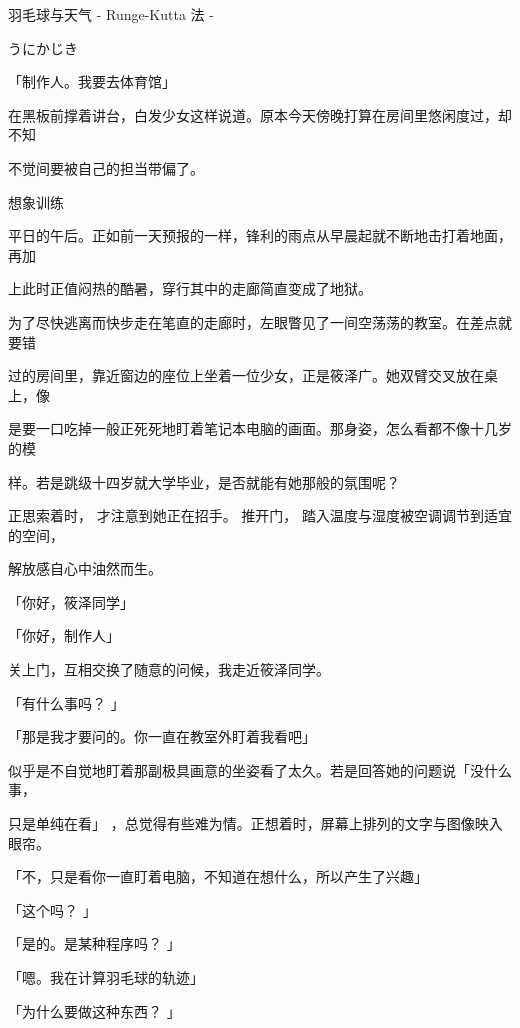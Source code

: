 羽毛球与天气 - Runge-Kutta 法 -\par
うにかじき\par
「制作人。我要去体育馆」\par
在黑板前撑着讲台，白发少女这样说道。原本今天傍晚打算在房间里悠闲度过，却不知\par
不觉间要被自己的担当带偏了。\par
想象训练\par
平日的午后。正如前一天预报的一样，锋利的雨点从早晨起就不断地击打着地面，再加\par
上此时正值闷热的酷暑，穿行其中的走廊简直变成了地狱。\par
为了尽快逃离而快步走在笔直的走廊时，左眼瞥见了一间空荡荡的教室。在差点就要错\par
过的房间里，靠近窗边的座位上坐着一位少女，正是筱泽广。她双臂交叉放在桌上，像\par
是要一口吃掉一般正死死地盯着笔记本电脑的画面。那身姿，怎么看都不像十几岁的模\par
样。若是跳级十四岁就大学毕业，是否就能有她那般的氛围呢？\par
正思索着时， 才注意到她正在招手。 推开门， 踏入温度与湿度被空调调节到适宜的空间，\par
解放感自心中油然而生。\par
「你好，筱泽同学」\par
「你好，制作人」\par
关上门，互相交换了随意的问候，我走近筱泽同学。\par
「有什么事吗？ 」\par
「那是我才要问的。你一直在教室外盯着我看吧」\par
似乎是不自觉地盯着那副极具画意的坐姿看了太久。若是回答她的问题说「没什么事，\par
只是单纯在看」 ，总觉得有些难为情。正想着时，屏幕上排列的文字与图像映入眼帘。\par
「不，只是看你一直盯着电脑，不知道在想什么，所以产生了兴趣」\par
「这个吗？ 」\par
「是的。是某种程序吗？ 」\par
「嗯。我在计算羽毛球的轨迹」\par
「为什么要做这种东西？ 」\par

